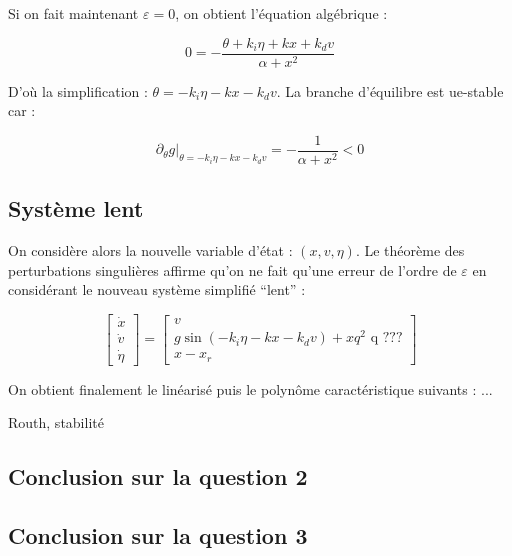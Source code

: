 \documentclass[10pt]{article}
\begin{document}
\noindent Si on fait maintenant $\varepsilon = 0$, on obtient l'équation algébrique :

\[
	0 = - \frac{\theta + k_i \eta + k x + k_d v}{\alpha + x^2}
\]

\noindent D'où la simplification :  $\theta = - k_i \eta - k x - k_d v$. La branche d'équilibre est ue-stable car :

\[
	\partial_{\theta} g |_{\theta = - k_i \eta - k x - k_d v} = - \frac{1}{\alpha + x^2} < 0
\]

\subsection*{Système lent}

\noindent On considère alors la nouvelle variable d'état : $(x, v, \eta)$. Le théorème des
perturbations singulières affirme qu'on ne fait qu'une erreur de l'ordre de $\varepsilon$
en considérant le nouveau système simplifié ``lent'' :

\[
	 \begin{bmatrix}
	 	\dot x \\
		\dot v \\
		\dot \eta
	\end{bmatrix} =
	\begin{bmatrix}
	 	v \\
		g \sin \left( - k_i \eta - k x - k_d v \right) + x q^2 \text{ q ???} \\
		x - x_r
	\end{bmatrix}
\]

\noindent On obtient finalement le linéarisé puis le polynôme caractéristique suivants : ...

\noindent Routh, stabilité

\subsection*{Conclusion sur la question 2}


\subsection*{Conclusion sur la question 3}

\end{document}
